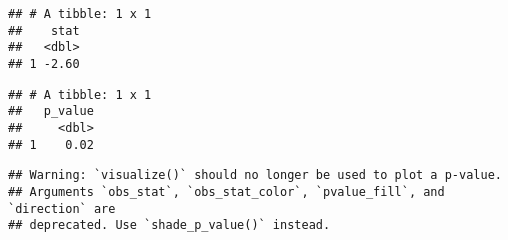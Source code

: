 \documentclass[]{article}
\newenvironment{Shaded}{\begin{snugshade}}{\end{snugshade}}
\newcommand{\DataTypeTok}[1]{\textcolor[rgb]{0.13,0.29,0.53}{#1}}
\newcommand{\DecValTok}[1]{\textcolor[rgb]{0.00,0.00,0.81}{#1}}
\newcommand{\KeywordTok}[1]{\textcolor[rgb]{0.13,0.29,0.53}{\textbf{#1}}}
\newcommand{\NormalTok}[1]{#1}
\newcommand{\OperatorTok}[1]{\textcolor[rgb]{0.81,0.36,0.00}{\textbf{#1}}}
\newcommand{\StringTok}[1]{\textcolor[rgb]{0.31,0.60,0.02}{#1}}
\begin{document}
\begin{verbatim}
## # A tibble: 1 x 1
##    stat
##   <dbl>
## 1 -2.60
\end{verbatim}

\begin{Shaded}
\end{Shaded}

\begin{verbatim}
## # A tibble: 1 x 1
##   p_value
##     <dbl>
## 1    0.02
\end{verbatim}

\begin{Shaded}
\end{Shaded}

\begin{verbatim}
## Warning: `visualize()` should no longer be used to plot a p-value.
## Arguments `obs_stat`, `obs_stat_color`, `pvalue_fill`, and `direction` are
## deprecated. Use `shade_p_value()` instead.
\end{verbatim}
\end{document}
